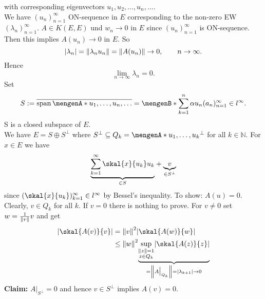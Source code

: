 \begin{beweis}
\begin{description}
\[		\]
		with corresponding eigenvectors $u_1,u_2, \dots,u_n, \dots$. \\
		We have $(u_n)_{n=1}^{\infty}$ ON-sequence in $E$ corresponding to the non-zero EW $(\lambda_n)_{n=1}^{\infty}$. $A \in K(E,E)$ und $w_n \to 0$ in $E$ since 
		$(u_n)_{n=1}^{\infty}$ is ON-sequence. \\
		Then this implies $A(u_n) \to 0$ in $E$. So \[
			\abs{\lambda_n} = \norm{\lambda_n u_n} = \norm{A(u_n)} \to 0, \qquad n \to \infty.
		\]
		Hence \[
			\lim_{n \to \infty} \lambda_n = 0.
		\]
		Set 
		\[
			S := \overline{\spn\set{u_1, \dots,u_n, \dots}} = \set[\sum_{k=1}^{n}\alpha u_n]{ (a_n)_{n=1}^{\infty} \in l^\infty}.
		\]
		S is a closed subspace of $E$. \\ We have $E = S \oplus S^{\perp}$ where $S^{\perp} \subseteq Q_k = \set{u_1,\dots,u_k}^{\perp}$ for all $k \in \mathbb{N}$.
		For $x \in E$ we have
		\[
			\underset{\in S}{\underbrace{\sum_{k=1}^{\infty} \skal{x}{u_k}u_k}} + \underset{\in S^{\perp}}{\underbrace{v}}
		\]
		since $(\skal{x}{u_k})_{k=1}^{\infty} \in l^\infty$ by Bessel's inequality. 
		To show: $A(u)=0$. Clearly, $v \in Q_k$ for all $k$. If $v = 0$ there is nothing to prove. For $v \neq 0$ set $w= \frac{1}{\norm{v}}v$ and get
		\begin{align*}
			\abs{\skal{A(v)}{v}} &= \norm{v}^2 \abs{ \skal{A(w)}{w}} \\
			&\leq \norm{w}^2 \underset{= \norm{A  \big|_{Q_k}^{}} = \abs{\lambda_{k+1}} \to 0}{\underbrace{\sup_{ \substack{\norm{z}=1 \\ z \in Q_k}} \abs{\skal{A(z)}{z}}}}
		\end{align*}
		\textbf{Claim:} \text{    }$A  \big|_{S^{\perp}}^{} = 0$ and hence $v \in S^{\perp}$ implies $A(v) = 0$.
	\end{description}
\end{beweis}


